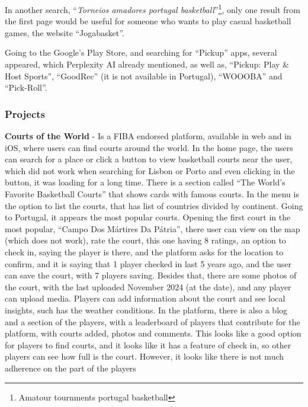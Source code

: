 In another search, ``\textit{Torneios amadores portugal basketball}''\footnote{Amatour tournments portugal basketball}, only one result from the first page would be useful for someone who wants to play casual basketball games, the website ``Jogabasket''\cite{jogabasket}.

Going to the Google's Play Store, and searching for ``Pickup'' apps, several appeared, which Perplexity AI already mentioned, as well as, ``Pickup: Play \& Host Sports''\cite{pickup, pickup-app}, ``GoodRec''\cite{goodrec} (it is not available in Portugal), ``WOOOBA''\cite{woooba} and ``Pick-Roll''\cite{pick-roll}.

\subsubsection{Projects}

\textbf{Courts of the World}\cite{fiba-courts} - Is a FIBA endorsed platform, available in web and in iOS, where users can find courts around the world.
In the home page, the users can search for a place or click a button to view basketball courts near the user, which did not work when searching for Lisbon or Porto and even clicking in the button, it was loading for a long time.
There is a section called ``The World’s Favorite Basketball Courts'' that shows cards with famous courts.
In the menu is the option to list the courts, that has list of countries divided by continent.
Going to Portugal, it appears the most popular courts.
Opening the first court in the most popular, ``Campo Dos Mártires Da Pátria'', there user can view on the map (which does not work), rate the court, this one having 8 ratings, an option to check in, saying the player is there, and the platform asks for the location to confirm, and it is saying that 1 player checked in last 5 years ago, and the user can save the court, with 7 players saving.
Besides that, there are some photos of the court, with the last uploaded November 2024 (at the date), and any player can upload media.
Players can add information about the court and see local insights, such has the weather conditions.
In the platform, there is also a blog and a section of the players, with a leaderboard of players that contribute for the platform, with courts added, photos and comments.
This looks like a good option for players to find courts, and it looks like it has a feature of check in, so other players can see how full is the court.
However, it looks like there is not much adherence on the part of the players

